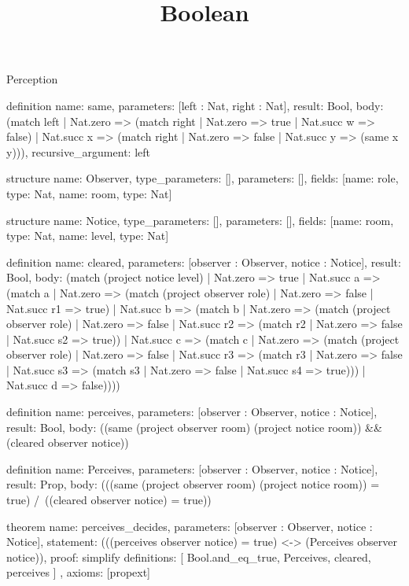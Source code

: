 \begin{lexlean}{Perception}
\title{Boolean}
\begin{semanticmodule}
definition{
  name: same,
  parameters: [left : Nat, right : Nat],
  result: Bool,
  body: (match left
    | Nat.zero => (match right
      | Nat.zero => true
      | Nat.succ w => false)
    | Nat.succ x => (match right
      | Nat.zero => false
      | Nat.succ y => (same x y))),
  recursive_argument: left
}

structure{
  name: Observer,
  type_parameters: [],
  parameters: [],
  fields: [{name: role, type: Nat}, {name: room, type: Nat}]
}

structure{
  name: Notice,
  type_parameters: [],
  parameters: [],
  fields: [{name: room, type: Nat}, {name: level, type: Nat}]
}

definition{
  name: cleared,
  parameters: [observer : Observer, notice : Notice],
  result: Bool,
  body: (match (project notice level)
    | Nat.zero => true
    | Nat.succ a => (match a
      | Nat.zero => (match (project observer role)
        | Nat.zero => false
        | Nat.succ r1 => true)
      | Nat.succ b => (match b
        | Nat.zero => (match (project observer role)
          | Nat.zero => false
          | Nat.succ r2 => (match r2
            | Nat.zero => false
            | Nat.succ s2 => true))
        | Nat.succ c => (match c
          | Nat.zero => (match (project observer role)
            | Nat.zero => false
            | Nat.succ r3 => (match r3
              | Nat.zero => false
              | Nat.succ s3 => (match s3
                | Nat.zero => false
                | Nat.succ s4 => true)))
          | Nat.succ d => false))))
}

definition{
  name: perceives,
  parameters: [observer : Observer, notice : Notice],
  result: Bool,
  body: ((same (project observer room) (project notice room)) && (cleared observer notice))
}

definition{
  name: Perceives,
  parameters: [observer : Observer, notice : Notice],
  result: Prop,
  body: (((same (project observer room) (project notice room)) = true) /\ ((cleared observer notice) = true))
}

theorem{
  name: perceives_decides,
  parameters: [observer : Observer, notice : Notice],
  statement: (((perceives observer notice) = true) <-> (Perceives observer notice)),
  proof: simplify{
    definitions: [
      Bool.and_eq_true,
      Perceives,
      cleared,
      perceives
    ]
  },
  axioms: [propext]
}
\end{semanticmodule}
\end{lexlean}

